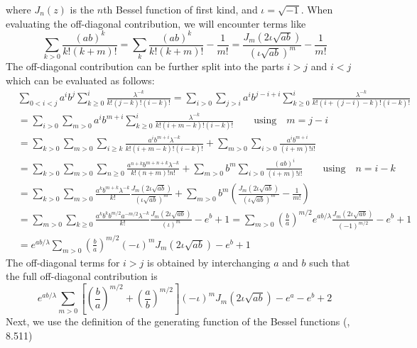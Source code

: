 \documentclass[prl,preprint]{revtex4}
\newcommand{\cp}{\iota}
\begin{document}
where $J_n(z)$ is the $n$th Bessel function of first kind, and $\cp=\sqrt{-1}$. 
When evaluating the off-diagonal contribution, we will encounter terms like
\begin{equation}
\sum_{k>0} \frac{(ab)^{k}}{k!(k+m)!} = \sum_{k} \frac{(ab)^{k}}{k!(k+m)!} - \frac{1}{m!} = \frac{J_m(2\cp\sqrt{ab})}{(\cp\sqrt{ab})^m}-\frac{1}{m!}
\end{equation}
The off-diagonal contribution can be further split into the parts $i>j$ and $i<j$ which can be evaluated as follows:
\begin{equation}
\begin{split}
&\sum_{0<i<j} a^{i}b^j\sum_{k\geq 0}^{i} \frac{\lambda^{-k}}{k!(j-k)!(i-k)!} 
= \sum_{i>0}\sum_{j>i} a^{i}b^{j-i+i}\sum_{k\geq 0}^{i} \frac{\lambda^{-k}}{k!(i+(j-i)-k)!(i-k)!}\\
& = \sum_{i>0}\sum_{m>0} a^{i}b^{m+i}\sum_{k\geq 0}^{i} \frac{\lambda^{-k}}{k!(i+m-k)!(i-k)!}  \quad\quad \mathrm{using}\quad m=j-i \\
&=\sum_{k>0}\sum_{m>0} \sum_{i\geq k} \frac{a^{i}b^{m+i}\lambda^{-k}}{k!(i+m-k)!(i-k)!} + \sum_{m>0} \sum_{i>0} \frac{a^{i}b^{m+i}}{(i+m)! i!} \\
&=\sum_{k>0}\sum_{m>0}\sum_{n\geq 0} \frac{ a^{n+k}b^{m+n+k}\lambda^{-k}}{k!(n+m)!n!} + \sum_{m>0} b^{m}\sum_{i>0} \frac{(ab)^{i}}{(i+m)! i!}  \quad\quad \mathrm{using}\quad n=i-k\\
&=\sum_{k>0}\sum_{m>0}\frac{ a^{k}b^{m+k}\lambda^{-k}}{k!}\frac{J_m(2\cp\sqrt{ab})}{(\cp\sqrt{ab})^m} + \sum_{m>0} b^{m}\left(\frac{J_m(2\cp\sqrt{ab})}{(\cp\sqrt{ab})^m} -\frac{1}{m!}\right)\\
&=\sum_{m>0}\sum_{k\geq 0}\frac{  a^{k}b^{k}b^{m/2}a^{-m/2}\lambda^{-k}}{k!}\frac{J_m(2\cp\sqrt{ab})}{(\cp)^m} -e^b+1 = \sum_{m>0} \left(\frac{b}{a}\right)^{m/2}e^{ab/\lambda}\frac{J_m(2\cp\sqrt{ab})}{(-1)^{m/2}} -e^b+1\\ &=e^{ab/\lambda}\sum_{m>0} \left(\frac{b}{a}\right)^{m/2}(-\cp)^m J_m(2\cp\sqrt{ab}) -e^b+1
\end{split}
\end{equation}
The off-diagonal terms for $i>j$ is obtained by interchanging $a$ and $b$ such that the full off-diagonal contribution is 
\begin{equation}
e^{ab/\lambda}\sum_{m>0} \left[\left(\frac{b}{a}\right)^{m/2}+\left(\frac{a}{b}\right)^{m/2}\right](-\cp)^m J_m(2\cp\sqrt{ab}) -e^a-e^b+2
\end{equation}
Next, we use the definition of the generating function of the Bessel functions (\citet{GR}, 8.511)
\end{document}
